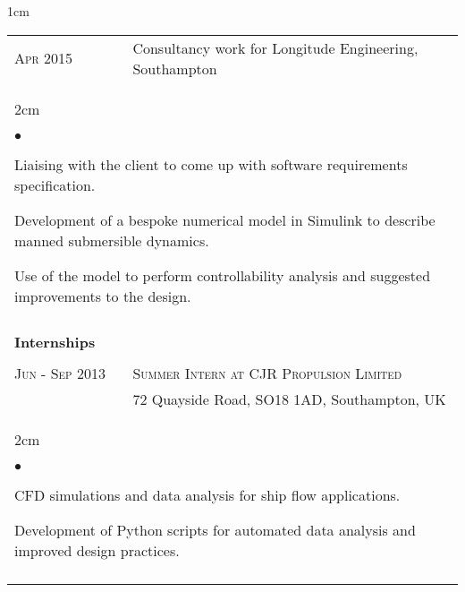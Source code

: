 \documentclass[a4paper,10pt]{article}
\newcommand{\squishlist}{
	\begin{list}{$\bullet$}
	{
		\setlength{\itemsep}{0pt}
		\setlength{\parsep}{0pt}
		\setlength{\topsep}{0pt}
		\setlength{\partopsep}{0pt}
		\setlength{\leftmargin}{2em}
		\setlength{\labelwidth}{1.5em}
		\setlength{\labelsep}{0.5em}
	}
}
\newcommand{\squishend}{\end{list}}
\begin{document}
\begin{minipage}{\textwidth}
\begin{adjustwidth}{}{1cm}
\begin{tabular}{p{3.5cm} p{12.9cm}}
\textsc{Apr 2015} & Consultancy work for Longitude Engineering, Southampton \vspace{0.1cm} \\
%
\multicolumn{2}{l}{
\hspace{1cm}\begin{minipage}[t]{\textwidth}
\begin{adjustwidth}{}{2cm}
\squishlist
	\item Liaising with the client to come up with software requirements specification.
	\item Development of a bespoke numerical model in Simulink to describe manned submersible dynamics.
	\item Use of the model to perform controllability analysis and suggested improvements to the design.
\squishend
\end{adjustwidth}
\end{minipage}
} \\


\\
\textbf{Internships} \\
\\

\textsc{Jun - Sep 2013} & \textsc{Summer Intern at CJR Propulsion Limited} \\
						& 72 Quayside Road, SO18 1AD, Southampton, UK \vspace{0.1cm} \\
%
\multicolumn{2}{l}{
\hspace{1cm}\begin{minipage}[t]{\textwidth}
\begin{adjustwidth}{}{2cm}
\squishlist
	\item CFD simulations and data analysis for ship flow applications.
	\item Development of Python scripts for automated data analysis and improved design practices.
\squishend
\end{adjustwidth}
\end{minipage}
} \\
\\


\end{tabular}
\end{adjustwidth}
\end{minipage}
\end{document}
